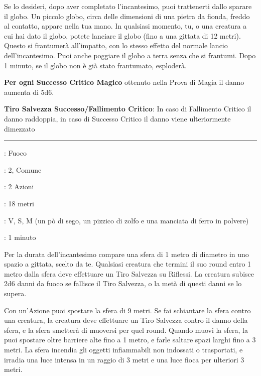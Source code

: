 \begin{multicols}{2}
Se lo desideri, dopo aver completato l'incantesimo, puoi trattenerti dallo sparare il globo. Un piccolo globo, circa delle dimensioni di una pietra da fionda, freddo al contatto, appare nella tua mano. In qualsiasi momento, tu, o una creatura a cui hai dato il globo, potete lanciare il globo (fino a una gittata di 12 metri). Questo si frantumerà all'impatto, con lo stesso effetto del normale lancio dell'incantesimo. Puoi anche poggiare il globo a terra senza che si frantumi. Dopo 1 minuto, se il globo non è già stato frantumato, esploderà.

\textbf{Per ogni Successo Critico Magico} ottenuto nella Prova di Magia il danno aumenta di 5d6.

\textbf{Tiro Salvezza Successo/Fallimento Critico}: In caso di Fallimento Critico il danno raddoppia, in caso di Successo Critico il danno viene ulteriormente dimezzato

\smallskip\noindent\rule{\linewidth}{2pt} \hypertarget{Sfera Infuocata}{}\smallskip{}
\noindent
\begin{description}[noitemsep, topsep=0pt, parsep=0pt, partopsep=0pt, leftmargin=0cm, labelwidth=2.8cm]
	\item[\textbf{Lista di Magia}]: Fuoco
	\item[\textbf{Livello}]: 2, Comune
	\item[\textbf{T. di Lancio}]: 2 Azioni
	\item[\textbf{Gittata}]: 18 metri
	\item[\textbf{Componenti}]: V, S, M (un pò di sego, un pizzico di zolfo e una manciata di ferro in polvere)
	\item[\textbf{Durata}]: 1 minuto
\end{description}

Per la durata dell'incantesimo compare una sfera di 1 metro di diametro in uno spazio a gittata, scelto da te. Qualsiasi creatura che termini il suo round entro 1 metro dalla sfera deve effettuare un Tiro Salvezza su Riflessi. La creatura subisce 2d6 danni da fuoco se fallisce il Tiro Salvezza, o la metà di questi danni se lo supera.

Con un'Azione puoi spostare la sfera di 9 metri. Se fai schiantare la sfera contro una creatura, la creatura deve effettuare un Tiro Salvezza contro il danno della sfera, e la sfera smetterà di muoversi per quel round.
Quando muovi la sfera, la puoi spostare oltre barriere alte fino a 1 metro, e farle saltare spazi larghi fino a 3 metri. La sfera incendia gli oggetti infiammabili non indossati o trasportati, e irradia una luce intensa in un raggio di 3 metri e una luce fioca per ulteriori 3 metri.


\end{multicols}
